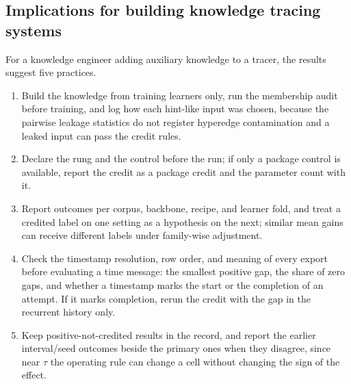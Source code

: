 \documentclass[review,12pt]{elsarticle}
\begin{document}
\subsection{Implications for building knowledge tracing systems}
For a knowledge engineer adding auxiliary knowledge to a tracer, the
results suggest five practices.
\begin{enumerate}
  \item Build the knowledge from training learners only, run the
  membership audit before training, and log how each hint-like input
  was chosen, because the pairwise leakage statistics do not register
  hyperedge contamination and a leaked input can pass the credit rules.
  \item Declare the rung and the control before the run; if only a
  package control is available, report the credit as a package credit
  and the parameter count with it.
  \item Report outcomes per corpus, backbone, recipe, and learner fold,
  and treat a credited label on one setting as a hypothesis on the next;
  similar mean gains can receive different labels under family-wise
  adjustment.
  \item Check the timestamp resolution, row order, and meaning of every
  export before evaluating a time message: the smallest positive gap,
  the share of zero gaps, and whether a timestamp marks the start or the
  completion of an attempt. If it marks completion, rerun the credit
  with the gap in the recurrent history only.
  \item Keep positive-not-credited results in the record, and report
  the earlier interval/seed outcomes beside the primary ones when they
  disagree, since near $\tau$ the operating rule can change a cell
  without changing the sign of the effect.
\end{enumerate}
\end{document}
